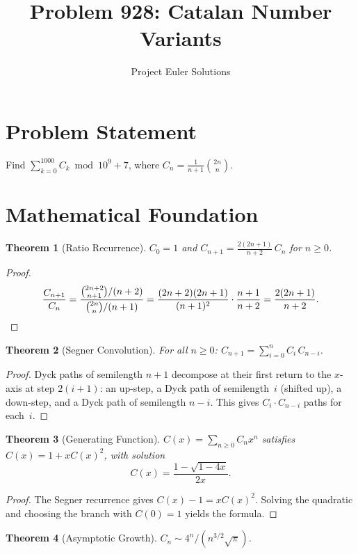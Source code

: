 \documentclass[11pt]{article}
\title{Problem 928: Catalan Number Variants}
\author{Project Euler Solutions}
\date{}
\newtheorem{theorem}{Theorem}
\theoremstyle{definition}
\begin{document}
\maketitle

\section{Problem Statement}

Find $\sum_{k=0}^{1000} C_k \bmod 10^9+7$, where $C_n = \frac{1}{n+1}\binom{2n}{n}$.

\section{Mathematical Foundation}

\begin{theorem}[Ratio Recurrence]
$C_0 = 1$ and $C_{n+1} = \frac{2(2n+1)}{n+2}\,C_n$ for $n \geq 0$.
\end{theorem}

\begin{proof}
\[
\frac{C_{n+1}}{C_n} = \frac{\binom{2n+2}{n+1}/(n+2)}{\binom{2n}{n}/(n+1)} = \frac{(2n+2)(2n+1)}{(n+1)^2}\cdot\frac{n+1}{n+2} = \frac{2(2n+1)}{n+2}. \qedhere
\]
\end{proof}

\begin{theorem}[Segner Convolution]
For all $n \geq 0$: $C_{n+1} = \sum_{i=0}^{n} C_i\,C_{n-i}$.
\end{theorem}

\begin{proof}
Dyck paths of semilength $n{+}1$ decompose at their first return to the $x$-axis at step $2(i{+}1)$: an up-step, a Dyck path of semilength~$i$ (shifted up), a down-step, and a Dyck path of semilength $n{-}i$. This gives $C_i \cdot C_{n-i}$ paths for each~$i$.
\end{proof}

\begin{theorem}[Generating Function]
$C(x) = \sum_{n \geq 0} C_n x^n$ satisfies $C(x) = 1 + xC(x)^2$, with solution
\[
C(x) = \frac{1 - \sqrt{1-4x}}{2x}.
\]
\end{theorem}

\begin{proof}
The Segner recurrence gives $C(x) - 1 = xC(x)^2$. Solving the quadratic and choosing the branch with $C(0) = 1$ yields the formula.
\end{proof}

\begin{theorem}[Asymptotic Growth]
$C_n \sim 4^n/(n^{3/2}\sqrt{\pi})$.
\end{theorem}
\end{document}
